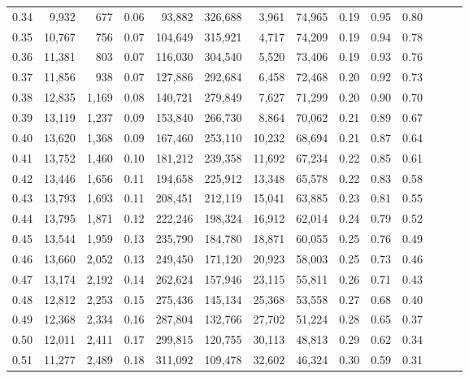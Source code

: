 \begin{tabular}{rrrrrrrrrrrrrr}
0.34 &   9,932 &    677 &  0.06 &   93,882 &  326,688 &   3,961 &  74,965 &  0.19 &  0.95 &      0.80 \\
0.35 &  10,767 &    756 &  0.07 &  104,649 &  315,921 &   4,717 &  74,209 &  0.19 &  0.94 &      0.78 \\
0.36 &  11,381 &    803 &  0.07 &  116,030 &  304,540 &   5,520 &  73,406 &  0.19 &  0.93 &      0.76 \\
0.37 &  11,856 &    938 &  0.07 &  127,886 &  292,684 &   6,458 &  72,468 &  0.20 &  0.92 &      0.73 \\
0.38 &  12,835 &  1,169 &  0.08 &  140,721 &  279,849 &   7,627 &  71,299 &  0.20 &  0.90 &      0.70 \\
0.39 &  13,119 &  1,237 &  0.09 &  153,840 &  266,730 &   8,864 &  70,062 &  0.21 &  0.89 &      0.67 \\
0.40 &  13,620 &  1,368 &  0.09 &  167,460 &  253,110 &  10,232 &  68,694 &  0.21 &  0.87 &      0.64 \\
0.41 &  13,752 &  1,460 &  0.10 &  181,212 &  239,358 &  11,692 &  67,234 &  0.22 &  0.85 &      0.61 \\
0.42 &  13,446 &  1,656 &  0.11 &  194,658 &  225,912 &  13,348 &  65,578 &  0.22 &  0.83 &      0.58 \\
0.43 &  13,793 &  1,693 &  0.11 &  208,451 &  212,119 &  15,041 &  63,885 &  0.23 &  0.81 &      0.55 \\
0.44 &  13,795 &  1,871 &  0.12 &  222,246 &  198,324 &  16,912 &  62,014 &  0.24 &  0.79 &      0.52 \\
0.45 &  13,544 &  1,959 &  0.13 &  235,790 &  184,780 &  18,871 &  60,055 &  0.25 &  0.76 &      0.49 \\
0.46 &  13,660 &  2,052 &  0.13 &  249,450 &  171,120 &  20,923 &  58,003 &  0.25 &  0.73 &      0.46 \\
0.47 &  13,174 &  2,192 &  0.14 &  262,624 &  157,946 &  23,115 &  55,811 &  0.26 &  0.71 &      0.43 \\
0.48 &  12,812 &  2,253 &  0.15 &  275,436 &  145,134 &  25,368 &  53,558 &  0.27 &  0.68 &      0.40 \\
0.49 &  12,368 &  2,334 &  0.16 &  287,804 &  132,766 &  27,702 &  51,224 &  0.28 &  0.65 &      0.37 \\
0.50 &  12,011 &  2,411 &  0.17 &  299,815 &  120,755 &  30,113 &  48,813 &  0.29 &  0.62 &      0.34 \\
0.51 &  11,277 &  2,489 &  0.18 &  311,092 &  109,478 &  32,602 &  46,324 &  0.30 &  0.59 &      0.31 \\

\end{tabular}

